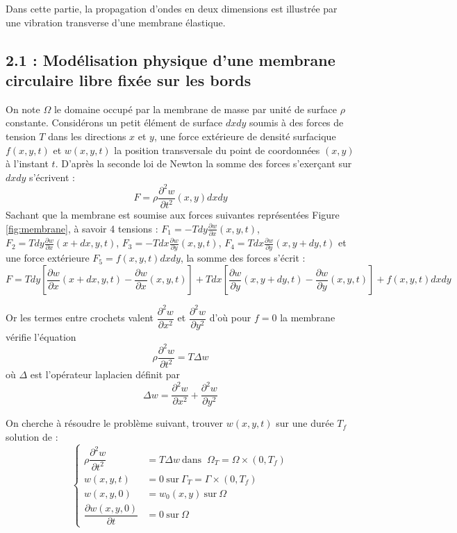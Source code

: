 \documentclass[a4,12pt]{article}
\begin{document}
  Dans cette partie, la propagation d'ondes en deux dimensions est illustrée par une vibration transverse d'une membrane élastique.

  \subsection*{2.1 : Modélisation physique d'une membrane circulaire libre fixée sur les bords}

  On note $\Omega$ le domaine occupé par la membrane de masse par unité de surface $\rho$ constante. Considérons un petit élément de surface $dxdy$ soumis à des forces de tension $T$  dans les directions $x$ et $y$, une force extérieure de densité surfacique $f(x,y,t)$ et $w(x,y,t)$ la position transversale du point de coordonnées $(x,y)$ à l'instant $t$. D'après la seconde loi de Newton la somme des forces s'exerçant sur $dxdy$ s'écrivent : 
  \[
    F=\rho  \frac{\partial^2 w}{\partial t^2}(x,y)dxdy
  \]
  Sachant que la membrane est soumise aux forces suivantes représentées Figure \ref{fig:membrane}, à savoir 4 tensions : $F_1=-Tdy\frac{\partial w}{\partial x}(x,y,t)$, $F_2=Tdy\frac{\partial w}{\partial x}(x+dx,y,t)$, $F_3=-Tdx\frac{\partial w}{\partial y}(x,y,t)$, $F_4=Tdx\frac{\partial w}{\partial y}(x,y+dy,t)$ et une force extérieure $F_5=f(x,y,t)dxdy$, la somme des forces s'écrit : 
  \[
    F=Tdy\left[\frac{\partial w}{\partial x}(x+dx,y,t)-\frac{\partial w}{\partial x}(x,y,t)\right]+Tdx\left[\frac{\partial w}{\partial y}(x,y+dy,t)-\frac{\partial w}{\partial y}(x,y,t)\right]+f(x,y,t)dxdy
  \]

  Or les termes entre crochets valent $\dfrac{\partial^2 w}{\partial x^2}$ et $\dfrac{\partial^2 w}{\partial y^2}$ d'où pour $f=0$ la membrane vérifie l'équation 
  \[
    \rho \dfrac{\partial^2 w}{\partial t^2}=T \Delta w
  \]
  où $\Delta$ est l'opérateur laplacien définit par 
  \[
    \Delta w=\dfrac{\partial^2 w}{\partial x^2}+\dfrac{\partial^2 w}{\partial y^2}
  \]


  On cherche à résoudre le problème suivant, trouver $w(x,y,t)$ sur une durée $T_f$ solution de :
  \begin{equation}
    \left\{
      \begin{array}{rl}
	\rho \dfrac{\partial^2 w}{\partial t^2} & =  T \Delta w ~\textrm{dans } ~ \Omega_T = \Omega \times (0,T_f)\\ 
	w(x,y,t)& =  0 ~\textrm{sur} ~ \Gamma_T=\Gamma \times (0,T_f)\\
	w(x,y,0)& = w_0(x,y) ~ \textrm{sur} ~\Omega \\
	\dfrac{\partial w(x,y,0)}{\partial t} & = 0 ~\textrm{sur} ~\Omega 
      \end{array}
      \right.
      \label{eq:membranemodel}
    \end{equation}
\end{document}
